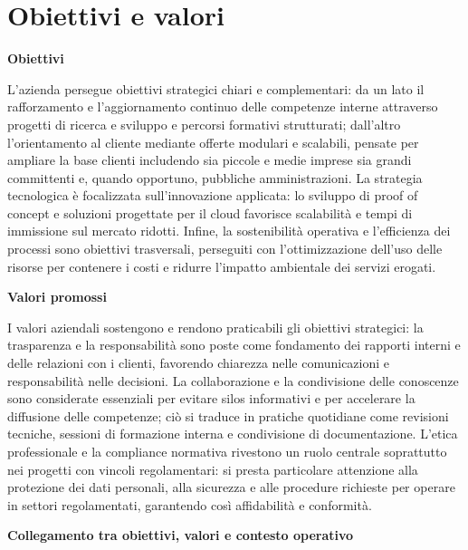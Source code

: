 \section{Obiettivi e valori}

\medskip
\noindent\textbf{Obiettivi}

L'azienda persegue obiettivi strategici chiari e complementari: da un lato il rafforzamento e l'aggiornamento continuo delle competenze interne attraverso progetti di ricerca e sviluppo e percorsi formativi 
strutturati; dall'altro l'orientamento al cliente mediante offerte modulari e scalabili, pensate per ampliare la base clienti includendo sia piccole e medie imprese sia grandi committenti e, 
quando opportuno, pubbliche amministrazioni. La strategia tecnologica è focalizzata sull'innovazione applicata: lo sviluppo di proof of concept e soluzioni progettate per il cloud favorisce 
scalabilità e tempi di immissione sul mercato ridotti. Infine, la sostenibilità operativa e l'efficienza dei processi sono obiettivi trasversali, perseguiti con l'ottimizzazione dell'uso 
delle risorse per contenere i costi e ridurre l'impatto ambientale dei servizi erogati.

\medskip
\noindent\textbf{Valori promossi}

I valori aziendali sostengono e rendono praticabili gli obiettivi strategici: la trasparenza e la responsabilità sono poste come fondamento dei 
rapporti interni e delle relazioni con i clienti, favorendo chiarezza nelle comunicazioni e responsabilità nelle decisioni. La collaborazione e 
la condivisione delle conoscenze sono considerate essenziali per evitare silos informativi e per accelerare la diffusione delle competenze; 
ciò si traduce in pratiche quotidiane come revisioni tecniche, sessioni di formazione interna e condivisione di documentazione. 
L'etica professionale e la compliance normativa rivestono un ruolo centrale soprattutto nei progetti con vincoli regolamentari: 
si presta particolare attenzione alla protezione dei dati personali, alla sicurezza e alle procedure richieste per operare in settori regolamentati, garantendo così affidabilità e conformità.

\medskip
\noindent\textbf{Collegamento tra obiettivi, valori e contesto operativo}


